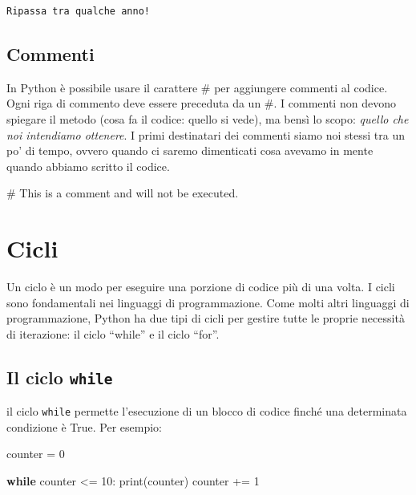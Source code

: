 \documentclass[
  letterpaper,
  krantz2]{{[}./krantz{]}}
\newenvironment{Shaded}{\begin{snugshade}}{\end{snugshade}}
\newcommand{\BuiltInTok}[1]{\textcolor[rgb]{0.00,0.23,0.31}{#1}}
\newcommand{\CommentTok}[1]{\textcolor[rgb]{0.37,0.37,0.37}{#1}}
\newcommand{\ControlFlowTok}[1]{\textcolor[rgb]{0.00,0.23,0.31}{\textbf{#1}}}
\newcommand{\DecValTok}[1]{\textcolor[rgb]{0.68,0.00,0.00}{#1}}
\newcommand{\NormalTok}[1]{\textcolor[rgb]{0.00,0.23,0.31}{#1}}
\newcommand{\OperatorTok}[1]{\textcolor[rgb]{0.37,0.37,0.37}{#1}}
\begin{document}
\begin{verbatim}
Ripassa tra qualche anno!
\end{verbatim}

\subsection{Commenti}\label{commenti}

In Python è possibile usare il carattere \# per aggiungere commenti al
codice. Ogni riga di commento deve essere preceduta da un \#. I commenti
non devono spiegare il metodo (cosa fa il codice: quello si vede), ma
bensì lo scopo: \emph{quello che noi intendiamo ottenere}. I primi
destinatari dei commenti siamo noi stessi tra un po' di tempo, ovvero
quando ci saremo dimenticati cosa avevamo in mente quando abbiamo
scritto il codice.

\begin{Shaded}
\begin{Highlighting}[]
\CommentTok{\# This is a comment and will not be executed.}
\end{Highlighting}
\end{Shaded}

\section{Cicli}\label{cicli}

Un ciclo è un modo per eseguire una porzione di codice più di una volta.
I cicli sono fondamentali nei linguaggi di programmazione. Come molti
altri linguaggi di programmazione, Python ha due tipi di cicli per
gestire tutte le proprie necessità di iterazione: il ciclo ``while'' e
il ciclo ``for''.

\subsection{\texorpdfstring{Il ciclo
\texttt{while}}{Il ciclo while}}\label{il-ciclo-while}

il ciclo \texttt{while} permette l'esecuzione di un blocco di codice
finché una determinata condizione è True. Per esempio:

\begin{Shaded}
\begin{Highlighting}[]
\NormalTok{counter }\OperatorTok{=} \DecValTok{0}

\ControlFlowTok{while}\NormalTok{ counter }\OperatorTok{\textless{}=} \DecValTok{10}\NormalTok{:}
    \BuiltInTok{print}\NormalTok{(counter)}
\NormalTok{    counter }\OperatorTok{+=} \DecValTok{1}
\end{Highlighting}
\end{Shaded}
\end{document}
